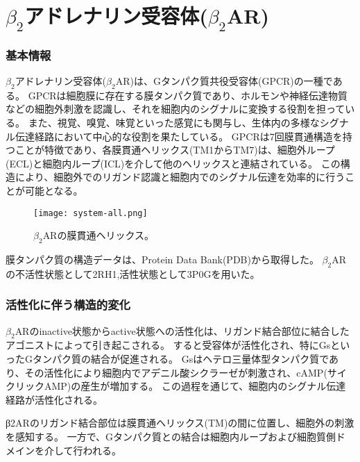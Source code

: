\section{$\beta_2$アドレナリン受容体($\beta_2$AR)}
\label{sec:b2ar}

\subsubsection{基本情報}
$\beta_2$アドレナリン受容体($\beta_2$AR)は、Gタンパク質共役受容体(GPCR)の一種である。
GPCRは細胞膜に存在する膜タンパク質であり、ホルモンや神経伝達物質などの細胞外刺激を認識し、それを細胞内のシグナルに変換する役割を担っている。
また、視覚、嗅覚、味覚といった感覚にも関与し、生体内の多様なシグナル伝達経路において中心的な役割を果たしている。
GPCRは7回膜貫通構造を持つことが特徴であり、各膜貫通ヘリックス(TM1からTM7)は、細胞外ループ(ECL)と細胞内ループ(ICL)を介して他のヘリックスと連結されている。
この構造により、細胞外でのリガンド認識と細胞内でのシグナル伝達を効率的に行うことが可能となる。

\begin{figure}[htbp]
  \centering
  \texttt{[image: system-all.png]}
  \caption{$\beta_2$ARの膜貫通ヘリックス。}
  \label{fig:inter}
\end{figure}

膜タンパク質の構造データは、Protein Data Bank(PDB)から取得した。
$\beta_2$ARの不活性状態として2RH1\cite{cherezov2007},活性状態として3P0G\cite{rasmussen2011}を用いた。

\subsubsection{活性化に伴う構造的変化}
$\beta_2$ARのinactive状態からactive状態への活性化は、リガンド結合部位に結合したアゴニストによって引き起こされる。
すると受容体が活性化され、特にGsといったGタンパク質の結合が促進される。
Gsはヘテロ三量体型タンパク質であり、その活性化により細胞内でアデニル酸シクラーゼが刺激され、cAMP(サイクリックAMP)の産生が増加する。
この過程\cite{philip2007}を通じて、細胞内のシグナル伝達経路が活性化される。

β2ARのリガンド結合部位は膜貫通ヘリックス(TM)の間に位置し、細胞外の刺激を感知する。
一方で、Gタンパク質との結合は細胞内ループおよび細胞質側ドメインを介して行われる。


